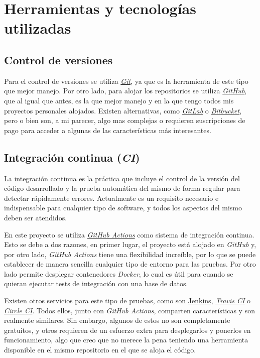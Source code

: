 \chapter{Herramientas y tecnologías utilizadas}

\section{Control de versiones}

Para el control de versiones se utiliza \href{https://git-scm.com/}{\textit{Git}}, ya que es la herramienta de este tipo que mejor manejo. Por otro lado, para alojar los repositorios se utiliza \href{https://github.com}{\textit{GitHub}}, que al igual que antes, es la que mejor manejo y en la que tengo todos mis proyectos personales alojados. Existen alternativas, como \href{https://about.gitlab.com/}{\textit{GitLab}} o \href{https://bitbucket.org/product/}{\textit{Bitbucket}}, pero o bien son, a mi parecer, algo mas complejas o requieren suscripciones de pago para acceder a algunas de las características más interesantes.

\section{Integración continua (\textit{CI})}

La integración continua es la práctica que incluye el control de la versión del código desarrollado y la prueba automática del mismo de forma regular para detectar rápidamente errores. Actualmente es un requisito necesario e indispensable para cualquier tipo de software, y todos los aspectos del mismo deben ser atendidos.

En este proyecto se utiliza \href{https://github.com/features/actions}{\textit{GitHub Actions}} como sistema de integración continua. Esto se debe a dos razones, en primer lugar, el proyecto está alojado en \textit{GitHub} y, por otro lado, \textit{GitHub Actions} tiene una flexibilidad increíble, por lo que se puede establecer de manera sencilla cualquier tipo de entorno para las pruebas. Por otro lado permite desplegar contenedores \textit{Docker}, lo cual es útil para cuando se quieran ejecutar tests de integración con una base de datos.

Existen otros servicios para este tipo de pruebas, como son \href{https://www.jenkins.io/}{Jenkins}, \href{https://travis-ci.org/}{\textit{Travis CI}} o \href{https://circleci.com/}{\textit{Circle CI}}. Todos ellos, junto con \textit{GitHub Actions}, comparten características y son realmente similares. Sin embargo, algunos de estos no son completamente gratuitos, y otros requieren de un esfuerzo extra para desplegarlos y ponerlos en funcionamiento, algo que creo que no merece la pena teniendo una herramienta disponible en el mismo repositorio en el que se aloja el código.

